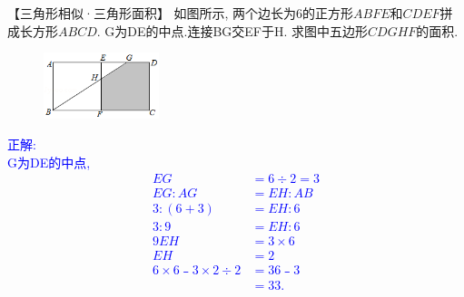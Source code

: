 \item {
    【三角形相似·三角形面积】
    如图所示, 两个边长为6的正方形$ABFE$和$CDEF$拼成长方形$ABCD$. G为DE的中点.连接BG交EF于H. 求图中五边形$CDGHF$的面积.
    \begin{figure}[H] 
        \centering
        \includegraphics[width=0.3\textwidth]{./pics/Chapter_2/13.png}
    \end{figure}
    \ifshowSolution 
        \fangsong{}\textcolor{blue}{
            正解: \\
            G为DE的中点,\\
            \begin{align*}
                EG&=6\div2=3 \\
                EG:AG&=EH:AB \\
                3:(6+3)&=EH:6 \\
                3:9&=EH:6 \\
                9EH&=3\times6 \\
                EH&=2 \\
                6\times6﹣3\times2\div2 &=36﹣3 \\
                &=33.
            \end{align*}
        }
    \else
        \vspace{1cm}
    \fi
}

